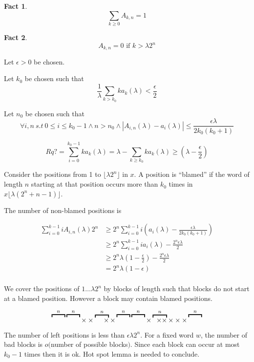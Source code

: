 \documentclass[11pt,a4paper]{tesis}
\newtheorem{fact}{Fact}[section]
\theoremstyle{definition}
\begin{document}
\begin{fact}
    $$\sum_{k \geq 0} A_{k,n} = 1$$
\end{fact}

\begin{fact}
    $$A_{k,n} = 0 \textrm{ if } k > \lambda2^n$$
\end{fact}

Let $\epsilon > 0$ be chosen.

Let $k_0$ be chosen such that 
$$\frac{1}{\lambda} \sum_{k > k_0} ka_k(\lambda) < \frac{\epsilon}{2}$$

Let $n_0$ be chosen such that 
$$\forall i,n \: s.t \:  0 \leq i \leq k_0 - 1 \wedge n > n_0 \wedge |A_{i,n}(\lambda) - a_i(\lambda)| \leq \frac{\epsilon\lambda}{2k_0(k_0+1)}$$

$$Rq? = \sum_{i=0}^{k_0-1} ka_k(\lambda) = \lambda - \sum_{k\geq k_0} ka_k(\lambda) \geq (\lambda - \frac{\epsilon}{2})$$

Consider the positions from 1 to $\lfloor\lambda2^n\rfloor$ in $x$. A position is ``blamed'' if the word of length $n$ starting at that position occurs more than $k_0$ times in $x\lfloor\lambda(2^n+n-1)\rfloor$.

The number of non-blamed positions is


\begin{align*}
    \sum_{i=0}^{k-1} iA_{i,n}(\lambda) 2^n &\geq 2^n\sum_{i=0}^{k-1} i (a_i(\lambda) - \frac{\epsilon\lambda}{2k_0(k_0+1)}) \\
    &\geq 2^n \sum_{i=0}^{k-1} ia_{i}(\lambda) - \frac{2^n\epsilon\lambda}{2} \\
    &\geq 2^n\lambda (1-\frac{\epsilon}{2}) - \frac{2^n\epsilon\lambda}{2} \\
    &= 2^n\lambda(1-\epsilon) \\
\end{align*}

We cover the positions of $1\dots \lambda2^n$ by blocks of length such that blocks do not start at a blamed  position. However a block may contain blamed positions.
 
$$\overbracket{\raisebox{6.4pt}{\qquad}}^{n} \overbracket{\raisebox{6.4pt}{\qquad}}^{n}\times\times\overbracket{\;\quad \times}^{n} \times \overbracket{\raisebox{6.4pt}{\qquad}}^{n} \overbracket{\raisebox{6.4pt}{\qquad}}^{n} \times \overbracket{\;\; \times \times}^{n} \times\times\times \overbracket{\raisebox{6.4pt}{\qquad}}^{n}$$


The number of left positions is less than $\epsilon\lambda2^n$. For a fixed word $w$, the number of bad blocks is $o($number of possible blocks$)$. Since each block can occur at most  $k_0 - 1$ times then it is ok.
Hot spot lemma  is needed to conclude.
\end{document}
